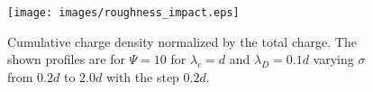
\begin{figure}
    \centering
    \texttt{[image: images/roughness\_impact.eps]}
    \caption{Cumulative charge density normalized by the total charge. The shown profiles are for $\Psi=10$ for $\lambda_c=d$ and $\lambda_D=0.1d$ varying $\sigma$ from $0.2d$ to $2.0d$ with the step $0.2d$. 
    }
    \label{fig:roughness_range}
\end{figure}





